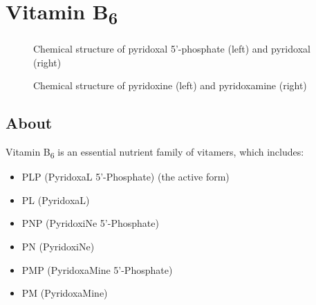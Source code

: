\documentclass{book}
\begin{document}
\begin{sloppypar}
\chapter{Vitamin B\texorpdfstring{\textsubscript{6}}{6}}
\begin{figure}[h]
	\caption{Chemical structure of pyridoxal 5'-phosphate (left) and pyridoxal (right)}
\end{figure}
\begin{figure}[h]
	\caption{Chemical structure of pyridoxine (left) and pyridoxamine (right)}
\end{figure}
\newpage

\section{About}
Vitamin B\textsubscript{6} is an essential nutrient family of vitamers, which includes:
\begin{itemize}
	\item PLP (PyridoxaL 5'-Phosphate) (the active form)
	\item PL (PyridoxaL)
	\item PNP (PyridoxiNe 5'-Phosphate)
	\item PN (PyridoxiNe)
	\item PMP (PyridoxaMine 5'-Phosphate)
	\item PM (PyridoxaMine)
\end{itemize}


\end{sloppypar}
\end{document}
